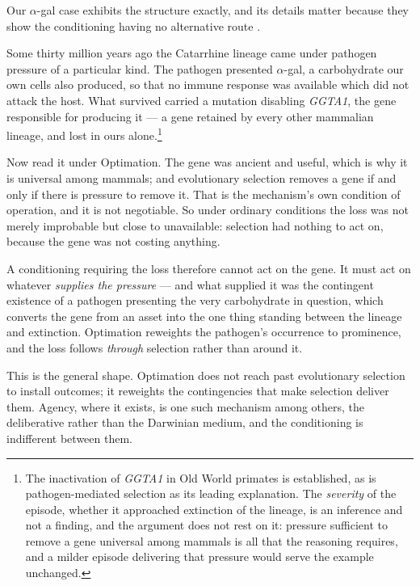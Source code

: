 \begin{example}\label{gc:ex:medium}
Our $\alpha$-gal case exhibits the structure exactly, and its
details matter because they show the conditioning having no alternative
route \cite{Nexus}.

Some thirty million years ago the Catarrhine lineage came under
pathogen pressure of a particular kind. The pathogen presented
$\alpha$-gal, a carbohydrate our own cells also produced, so that no
immune response was available which did not attack the host. What
survived carried a mutation disabling \textit{GGTA1}, the gene
responsible for producing it --- a gene retained by every other
mammalian lineage, and lost in ours alone.\footnote{The inactivation of
\textit{GGTA1} in Old World primates is established, as is
pathogen-mediated selection as its leading explanation. The
\emph{severity} of the episode, whether it approached extinction of
the lineage, is an inference and not a finding, and the argument does
not rest on it: pressure sufficient to remove a gene universal among
mammals is all that the reasoning requires, and a milder episode
delivering that pressure would serve the example unchanged.}

Now read it under Optimation. The gene was ancient and useful, which is
why it is universal among mammals; and evolutionary selection removes a
gene if and only if there is pressure to remove it. That is the
mechanism's own condition of operation, and it is not negotiable. So
under ordinary conditions the loss was not merely improbable but close
to unavailable: selection had nothing to act on, because the gene was
not costing anything.

A conditioning requiring the loss therefore cannot act on the gene. It
must act on whatever \emph{supplies the pressure} --- and what supplied
it was the contingent existence of a pathogen presenting the very
carbohydrate in question, which converts the gene from an asset into the
one thing standing between the lineage and extinction. Optimation
reweights the pathogen's occurrence to prominence, and the loss follows
\emph{through} selection rather than around it.

This is the general shape. Optimation does not reach past evolutionary
selection to install outcomes; it reweights the contingencies that make
selection deliver them. Agency, where it exists, is one such mechanism
among others, the deliberative rather than the Darwinian medium, and the conditioning is indifferent between them.
\end{example}

